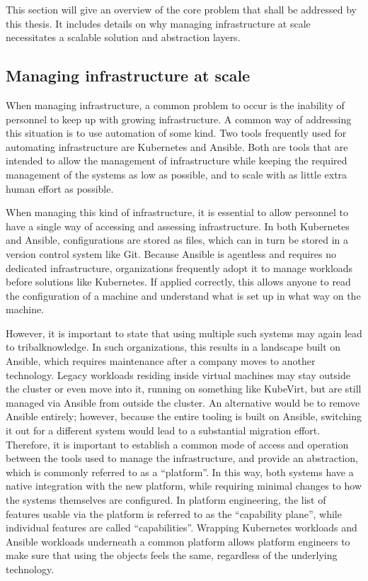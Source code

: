 This section will give an overview of the core problem that shall be addressed by this thesis.
It includes details on why managing infrastructure at scale necessitates a scalable solution and abstraction layers.

\subsection{Managing infrastructure at scale}
When managing infrastructure, a common problem to occur is the inability of personnel to keep up with growing infrastructure.
A common way of addressing this situation is to use automation of some kind.
Two tools frequently used for automating infrastructure are Kubernetes and Ansible.
Both are tools that are intended to allow the management of infrastructure while keeping the required management of the systems as low as possible, and to scale with as little extra human effort as possible.
\parencite{ansibledocsindex, k8swebsite, google-sre}

When managing this kind of infrastructure, it is essential to allow personnel to have a single way of accessing and assessing infrastructure.
In both Kubernetes and Ansible, configurations are stored as files, which can in turn be stored in a version control system like Git.
Because Ansible is agentless and requires no dedicated infrastructure, organizations frequently adopt it to manage workloads before solutions like Kubernetes.
If applied correctly, this allows anyone to read the configuration of a machine and understand what is set up in what way on the machine.
\parencite{platformengineering-architects, poulton2025kubernetes}

However, it is important to state that using multiple such systems may again lead to \gls{tribalknowledge}.
In such organizations, this results in a landscape built on Ansible, which requires maintenance after a company moves to another technology.
Legacy workloads residing inside virtual machines may stay outside the cluster or even move into it, running on something like KubeVirt, but are still managed via Ansible from outside the cluster.
An alternative would be to remove Ansible entirely; however, because the entire tooling is built on Ansible, switching it out for a different system would lead to a substantial migration effort.
Therefore, it is important to establish a common mode of access and operation between the tools used to manage the infrastructure, and provide an abstraction, which is commonly referred to as a \enquote{platform}.
In this way, both systems have a native integration with the new platform, while requiring minimal changes to how the systems themselves are configured.
In platform engineering, the list of features usable via the platform is referred to as the \enquote{capability plane}, while individual features are called \enquote{capabilities}.
Wrapping Kubernetes workloads and Ansible workloads underneath a common platform allows platform engineers to make sure that using the objects feels the same, regardless of the underlying technology.
\parencite{platformengineering-architects, kubevirt}

